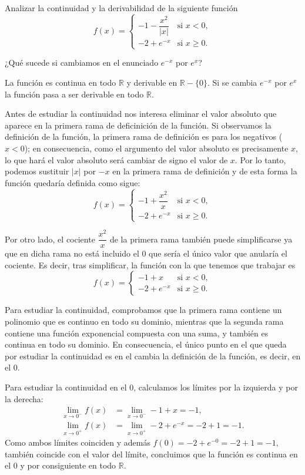{Analizar la continuidad y la derivabilidad de la siguiente función
\[
f(x)= 
\begin{cases}
-1-\dfrac{x^{2}}{\left| x\right| } & \mbox{si $x<0$}, \\ 
-2+e^{-x} & \mbox{si $x\geq 0$}.
\end{cases}
\]

¿Qué sucede si cambiamos en el enunciado $e^{-x}$ por $e^{x}$?
}
{La función es continua en todo $\mathbb{R}$ y derivable en $\mathbb{R}-\{0\}$.
Si se cambia $e^{-x}$ por $e^{x}$ la función pasa a ser derivable en todo $\mathbb{R}$.
}
{Antes de estudiar la continuidad nos interesa eliminar el valor absoluto que aparece en la primera rama de deficinición de la función. Si observamos la definición de la función, la primera rama de definición es para los negativos ($x<0$); en consecuencia, como el argumento del valor absoluto es precisamente $x$, lo que hará el valor absoluto será cambiar de signo el valor de $x$. Por lo tanto, podemos sustituir $\left|x\right|$ por $-x$ en la primera rama de definición y de esta forma la función quedaría definida como sigue: 
\[
f(x)= 
\begin{cases}
-1+\dfrac{x^{2}}{x} & \mbox{si $x<0$}, \\ 
-2+e^{-x} & \mbox{si $x\geq 0$}.
\end{cases}
\]

Por otro lado, el cociente $\dfrac{x^{2}}{x}$ de la primera rama también puede simplificarse ya que en dicha rama no está incluido el 0 que sería el único valor que anularía el cociente. Es decir, tras simplificar, la función con la que tenemos que trabajar es
\[
f(x)= 
\begin{cases}
-1+x & \mbox{si $x<0$}, \\ 
-2+e^{-x} & \mbox{si $x\geq 0$}.
\end{cases}
\]

Para estudiar la continuidad, comprobamos que la primera rama contiene un polinomio que es continuo en todo su dominio, mientras que la segunda rama contiene una función exponencial compuesta con una suma, y también es continua en todo su dominio. En consecuencia, el único punto en el que queda por estudiar la continuidad es en el cambia la definición de la función, es decir, en el 0.

Para estudiar la continuidad en el 0, calculamos los límites por la izquierda y por la derecha: 
\begin{align*}
\lim_{x\rightarrow 0^{-}}f(x) &= \lim_{x\rightarrow 0^{-}}-1+x=-1, \\
\lim_{x\rightarrow 0^{+}}f(x) &= \lim_{x\rightarrow 0^{+}}-2+e^{-x}=-2+1=-1.
\end{align*}
Como ambos límites coinciden y además $f(0)=-2+e^{-0}=-2+1=-1,$ también coincide con el valor del límite, concluimos que la función es continua en el 0 y por consiguiente en todo $\mathbb{R}$.

}
